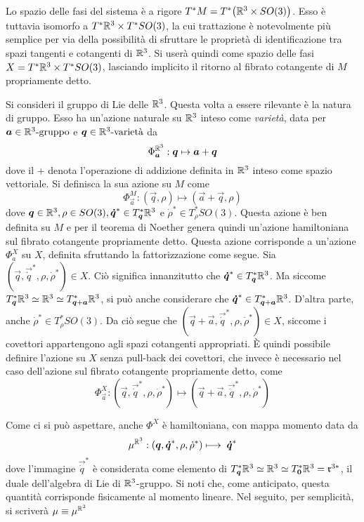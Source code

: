 Lo spazio delle fasi del sistema è a rigore $T^*M = T^*\big(\mathbb{R}^3 \times SO(3)\big)$. Esso è tuttavia isomorfo a $T^*\mathbb{R}^3 \times T^*SO(3)$, la cui trattazione è notevolmente più semplice per via della possibilità di sfruttare le proprietà di identificazione tra spazi tangenti e cotangenti di $\mathbb{R}^3$. Si userà quindi come spazio delle fasi $X = T^*\mathbb{R}^3 \times T^*SO(3)$, lasciando implicito il ritorno al fibrato cotangente di $M$ propriamente detto.

Si consideri il gruppo di Lie delle  $\mathbb{R}^3$. Questa volta a essere rilevante è la natura di gruppo. Esso ha un'azione naturale su $\mathbb{R}^3$ inteso come \emph{varietà}, data per $\boldsymbol{a} \in \mathbb{R}^3\text{-gruppo}$ e $\boldsymbol{q} \in \mathbb{R}^3\text{-varietà}$ da
\begin{equation*}
\Phi_{\boldsymbol{a}}^{\mathbb{R}^3}: \boldsymbol{q} \mapsto  \boldsymbol{a} + \boldsymbol{q}
\end{equation*}
dove il $+$ denota l'operazione di addizione definita in $\mathbb{R}^3$ inteso come spazio vettoriale. Si definisca la sua azione su $M$ come 
\begin{equation*}
  \Phi_{\vec{a}}^M: (\vec{q},\rho) \longmapsto (\vec{a} + \vec{q},\rho)
\end{equation*}
dove $\boldsymbol{q} \in \mathbb{R}^3, \rho \in SO(3), \boldsymbol{\dot{q}}^* \in T^*_{\boldsymbol{q}}\mathbb{R}^3$ e $\dot{\rho}^* \in T^*_{\rho}SO(3)$. Questa azione è ben definita su $M$ e per il teorema di Noether genera quindi un'azione hamiltoniana sul fibrato cotangente propriamente detto. Questa azione corrisponde a un'azione $\Phi^X_a$ su $X$, definita sfruttando la fattorizzazione come segue. Sia $(\vec{q},\vec{\dot{q}}^*, \rho, \dot{\rho}^*) \in X$. Ciò significa innanzitutto che $\boldsymbol{\dot{q}}^* \in T^*_{\boldsymbol{q}}\mathbb{R}^3$. Ma siccome $T^*_{\boldsymbol{q}}\mathbb{R}^3 \simeq \mathbb{R}^3 \simeq T^*_{\boldsymbol{q}+\boldsymbol{a}}\mathbb{R}^3$, si può anche considerare che $\boldsymbol{\dot{q}}^* \in T^*_{\boldsymbol{q}+\boldsymbol{a}}\mathbb{R}^3$. D'altra parte, anche $\dot{\rho}^* \in  T^*_{\rho}SO(3)$. Da ciò segue che $(\vec{q} +\vec{a},\vec{\dot{q}}^*, \rho, \dot{\rho}^*) \in X$, siccome i covettori appartengono agli spazi cotangenti appropriati. È quindi possibile definire l'azione su $X$ senza pull-back dei covettori, che invece è necessario nel caso dell'azione sul fibrato cotangente propriamente detto, come 
\begin{equation*}
\Phi^X_{\vec{a}}: (\vec{q},\vec{\dot{q}}^*, \rho, \dot{\rho}^*) \longmapsto (\vec{q}+ \vec{a},\vec{\dot{q}}^*, \rho, \dot{\rho}^*) 
\end{equation*}  

Come ci si può aspettare, anche $\Phi^X$ è hamiltoniana, con mappa momento data da
\begin{equation*}
\mu^{\mathbb{R}^3}: (\boldsymbol{q}, \boldsymbol{\dot{q}}^*, \rho, \dot{\rho}^*) \longmapsto\; \boldsymbol{\dot{q}}^*
\end{equation*} 
dove l'immagine $\vec{\dot{q}}^*$ è considerata come elemento di $T^*_{\boldsymbol{q}}\mathbb{R}^3 \simeq \mathbb{R}^3 \simeq T^*_{\boldsymbol{0}}\mathbb{R}^3 = \mathfrak{r}^{3*}$, il duale dell'algebra di Lie di $\mathbb{R}^3$-gruppo. Si noti che, come anticipato, questa quantità corrisponde fisicamente al momento lineare. Nel seguito, per semplicità, si scriverà $\mu \equiv \mu^{\mathbb{R}^3}$

